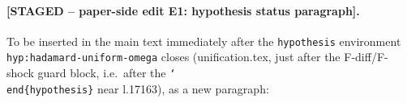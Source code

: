 %
%
\newif\ifanstagepaper
\anstagepaperfalse   %

%
%     
%

\ifanstagepaper

\paragraph*{[STAGED -- paper-side edit E1: hypothesis status paragraph].}
To be inserted in the main text immediately after the
\texttt{hypothesis} environment
\texttt{hyp:hadamard-uniform-omega} closes (unification.tex, just after
the F-diff/F-shock guard block, i.e.\ after the
\texttt{\char`\\end\{hypothesis\}} near l.17163), as a new paragraph:

